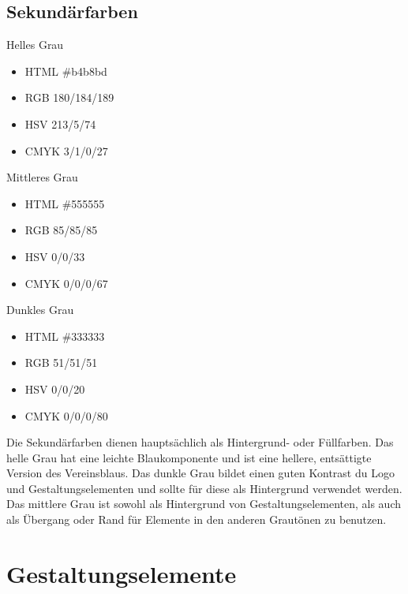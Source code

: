 \documentclass{article}
\begin{document}
\subsection{Sekundärfarben}
\begin{samepage}
\cfield[SECLight]
Helles Grau
\begin{itemize}
\item HTML \#b4b8bd
\item RGB 180/184/189
\item HSV 213/5/74
\item CMYK 3/1/0/27
\end{itemize}
\end{samepage}

\begin{samepage}
\cfield[SECMedium]
Mittleres Grau
\begin{itemize}
\item HTML \#555555
\item RGB 85/85/85
\item HSV 0/0/33
\item CMYK 0/0/0/67
\end{itemize}
\end{samepage}

\begin{samepage}
\cfield[SECDark]
Dunkles Grau
\begin{itemize}
\item HTML \#333333
\item RGB 51/51/51
\item HSV 0/0/20
\item CMYK 0/0/0/80
\end{itemize}
\end{samepage}

Die Sekundärfarben dienen hauptsächlich als Hintergrund- oder Füllfarben. Das helle Grau hat eine leichte Blaukomponente und ist eine hellere, entsättigte Version des Vereinsblaus. Das dunkle Grau bildet einen guten Kontrast du Logo und Gestaltungselementen und sollte für diese als Hintergrund verwendet werden. Das mittlere Grau ist sowohl als Hintergrund von Gestaltungselementen, als auch als Übergang oder Rand für Elemente in den anderen Grautönen zu benutzen.

\section{Gestaltungselemente}
\end{document}
